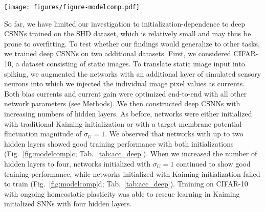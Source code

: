 \documentclass[11pt,a4paper]{article}
\begin{document}
\begin{SCfigure}[10][t]
    \centering
    \texttt{[image: figures/figure-modelcomp.pdf]}
    \caption{\textbf{Fluctuation-driven initialization enables training of deep \acp{SNN} across multiple datasets.} 
    \textbf{(a)}~Test accuracy of three-layer \acp{CSNN} trained on the SHD dataset. Networks were initialized either with standard Kaiming initialization (Kaiming) or fluctuation-driven initialization with $\sigma_U=1$. All error bars indicate standard deviation across five runs.
    \textbf{(b)}~Test accuracy of seven-layer \acp{CSNN} trained on the SHD dataset. Networks with Kaiming initialization were additionally trained with ongoing homeostatic plasticity (Kaiming \& Hom.\ plast.) 
    \textbf{(c)}~Same as panel (a), but for two-layer networks trained on the CIFAR-10 dataset.
    \textbf{(d)}~Same as panel (b), but for four-layer networks trained on the CIFAR-10 dataset.
    \textbf{(e)}~Same as panel (a), but for six-layer networks  trained on the DVS-Gestures dataset.
    \textbf{(f)}~Same as panel (b), but for eight-layer networks trained on the DVS-Gestures dataset.
    }
    \label{fig:modelcomp}
\end{SCfigure}


So far, we have limited our investigation to initialization-dependence to deep \acp{CSNN} trained on the SHD dataset, which is relatively small and may thus be prone to overfitting.
To test whether our findings would generalize to other tasks, we trained deep \acp{CSNN} on two additional datasets. 
First, we considered CIFAR-10, a dataset consisting of static images.
To translate static image input into spiking, we augmented the networks with an additional layer of simulated sensory neurons into which we injected the individual image pixel values as currents. 
Both bias currents and current gain were optimized end-to-end with all other network parameters (see Methods).
We then constructed deep \acp{CSNN} with increasing numbers of hidden layers.
As before, networks were either initialized with traditional Kaiming initialization or with a target membrane potential fluctuation magnitude of $\sigma_U = 1$.
We observed that networks with up to two hidden layers showed good training performance with both initializations (Fig.~\ref{fig:modelcomp}c; Tab.~\ref{tab:acc_deep}). 
When we increased the number of hidden layers to four, networks initialized with $\sigma_U = 1$ continued to show good training performance, while networks initialized with Kaiming initialization failed to train (Fig.~\ref{fig:modelcomp}d; Tab.~\ref{tab:acc_deep}).
Training on CIFAR-10 with ongoing homeostatic plasticity was able to rescue learning in Kaiming initialized \acp{SNN} with four hidden layers.
\end{document}
